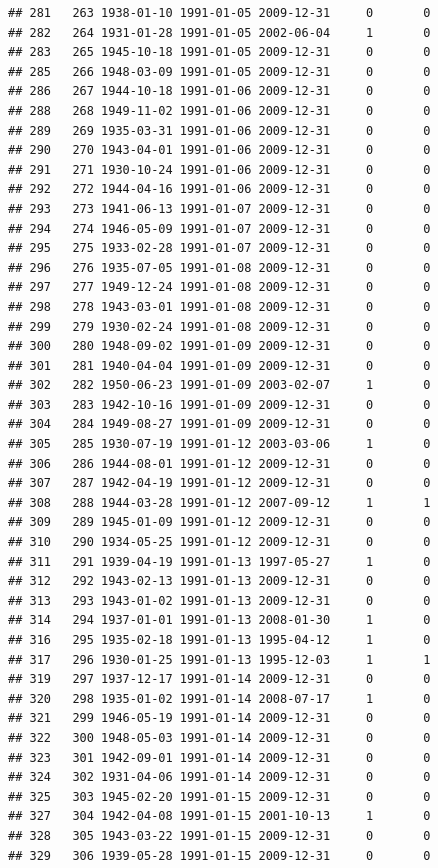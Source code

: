 \documentclass[
]{book}
\begin{document}
\begin{verbatim}
## 281   263 1938-01-10 1991-01-05 2009-12-31     0       0
## 282   264 1931-01-28 1991-01-05 2002-06-04     1       0
## 283   265 1945-10-18 1991-01-05 2009-12-31     0       0
## 285   266 1948-03-09 1991-01-05 2009-12-31     0       0
## 286   267 1944-10-18 1991-01-06 2009-12-31     0       0
## 288   268 1949-11-02 1991-01-06 2009-12-31     0       0
## 289   269 1935-03-31 1991-01-06 2009-12-31     0       0
## 290   270 1943-04-01 1991-01-06 2009-12-31     0       0
## 291   271 1930-10-24 1991-01-06 2009-12-31     0       0
## 292   272 1944-04-16 1991-01-06 2009-12-31     0       0
## 293   273 1941-06-13 1991-01-07 2009-12-31     0       0
## 294   274 1946-05-09 1991-01-07 2009-12-31     0       0
## 295   275 1933-02-28 1991-01-07 2009-12-31     0       0
## 296   276 1935-07-05 1991-01-08 2009-12-31     0       0
## 297   277 1949-12-24 1991-01-08 2009-12-31     0       0
## 298   278 1943-03-01 1991-01-08 2009-12-31     0       0
## 299   279 1930-02-24 1991-01-08 2009-12-31     0       0
## 300   280 1948-09-02 1991-01-09 2009-12-31     0       0
## 301   281 1940-04-04 1991-01-09 2009-12-31     0       0
## 302   282 1950-06-23 1991-01-09 2003-02-07     1       0
## 303   283 1942-10-16 1991-01-09 2009-12-31     0       0
## 304   284 1949-08-27 1991-01-09 2009-12-31     0       0
## 305   285 1930-07-19 1991-01-12 2003-03-06     1       0
## 306   286 1944-08-01 1991-01-12 2009-12-31     0       0
## 307   287 1942-04-19 1991-01-12 2009-12-31     0       0
## 308   288 1944-03-28 1991-01-12 2007-09-12     1       1
## 309   289 1945-01-09 1991-01-12 2009-12-31     0       0
## 310   290 1934-05-25 1991-01-12 2009-12-31     0       0
## 311   291 1939-04-19 1991-01-13 1997-05-27     1       0
## 312   292 1943-02-13 1991-01-13 2009-12-31     0       0
## 313   293 1943-01-02 1991-01-13 2009-12-31     0       0
## 314   294 1937-01-01 1991-01-13 2008-01-30     1       0
## 316   295 1935-02-18 1991-01-13 1995-04-12     1       0
## 317   296 1930-01-25 1991-01-13 1995-12-03     1       1
## 319   297 1937-12-17 1991-01-14 2009-12-31     0       0
## 320   298 1935-01-02 1991-01-14 2008-07-17     1       0
## 321   299 1946-05-19 1991-01-14 2009-12-31     0       0
## 322   300 1948-05-03 1991-01-14 2009-12-31     0       0
## 323   301 1942-09-01 1991-01-14 2009-12-31     0       0
## 324   302 1931-04-06 1991-01-14 2009-12-31     0       0
## 325   303 1945-02-20 1991-01-15 2009-12-31     0       0
## 327   304 1942-04-08 1991-01-15 2001-10-13     1       0
## 328   305 1943-03-22 1991-01-15 2009-12-31     0       0
## 329   306 1939-05-28 1991-01-15 2009-12-31     0       0

\end{verbatim}
\end{document}
